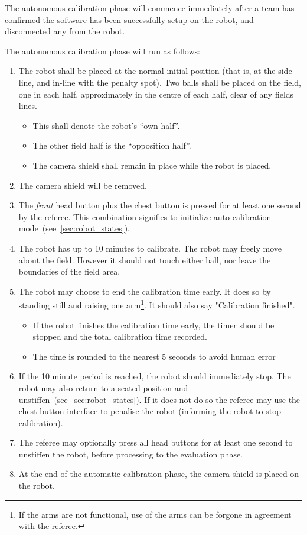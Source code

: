 The autonomous calibration phase will commence immediately after a team has confirmed the software has been successfully setup on the robot, and disconnected any from the robot.

The autonomous calibration phase will run as follows:
\begin{enumerate}
    \item The robot shall be placed at the normal initial position (that is, at the side-line, and in-line with the penalty spot). Two balls shall be placed on the field, one in each half, approximately in the centre of each half, clear of any fields lines.
    \begin{itemize}
        \item This shall denote the robot's  ``own half''.
        \item The other field half is the ``opposition half''.
        \item The camera shield shall remain in place while the robot is placed.
    \end{itemize} 
    \item The camera shield will be removed.
    \item The \textit{front} head button plus the chest button is pressed for at least one second by the referee. This combination signifies to initialize auto calibration mode~(see~\ref{sec:robot_states}).
    \item The robot has up to 10 minutes to calibrate. The robot may freely move about the field. However it should not touch either ball, nor leave the boundaries of the field area.
    \item The robot may choose to end the calibration time early. It does so by standing still and raising one arm\footnote{If the arms are not functional, use of the arms can be forgone in agreement with the referee.}. It should also say "Calibration finished".
    \begin{itemize}
        \item If the robot finishes the calibration time early, the timer should be stopped and the total calibration time recorded.
        \item The time is rounded to the nearest 5 seconds to avoid human error
    \end{itemize} 
    \item If the 10 minute period is reached, the robot should immediately stop. The robot may also return to a seated position and unstiffen~(see~\ref{sec:robot_states}). If it does not do so the referee may use the chest button interface to penalise the robot (informing the robot to stop calibration). 
    \item The referee may optionally press all head buttons for at least one second to unstiffen the robot, before processing to the evaluation phase.
    \item At the end of the automatic calibration phase, the camera shield is placed on the robot.
\end{enumerate} 

